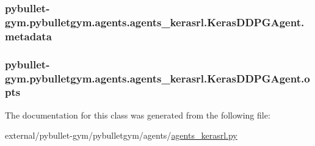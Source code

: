 \subsubsection[{\texorpdfstring{metadata}{metadata}}]{\setlength{\rightskip}{0pt plus 5cm}pybullet-\/gym.\+pybulletgym.\+agents.\+agents\+\_\+kerasrl.\+Keras\+D\+D\+P\+G\+Agent.\+metadata}\hypertarget{classpybullet-gym_1_1pybulletgym_1_1agents_1_1agents__kerasrl_1_1_keras_d_d_p_g_agent_ab2872670abc02ba05a444305cb38cd07}{}\label{classpybullet-gym_1_1pybulletgym_1_1agents_1_1agents__kerasrl_1_1_keras_d_d_p_g_agent_ab2872670abc02ba05a444305cb38cd07}
\subsubsection[{\texorpdfstring{opts}{opts}}]{\setlength{\rightskip}{0pt plus 5cm}pybullet-\/gym.\+pybulletgym.\+agents.\+agents\+\_\+kerasrl.\+Keras\+D\+D\+P\+G\+Agent.\+opts}\hypertarget{classpybullet-gym_1_1pybulletgym_1_1agents_1_1agents__kerasrl_1_1_keras_d_d_p_g_agent_a55d72f537c22447f4e7396eed295e7ab}{}\label{classpybullet-gym_1_1pybulletgym_1_1agents_1_1agents__kerasrl_1_1_keras_d_d_p_g_agent_a55d72f537c22447f4e7396eed295e7ab}


The documentation for this class was generated from the following file\+:\begin{DoxyCompactItemize}
\item 
external/pybullet-\/gym/pybulletgym/agents/\hyperlink{agents__kerasrl_8py}{agents\+\_\+kerasrl.\+py}\end{DoxyCompactItemize}
